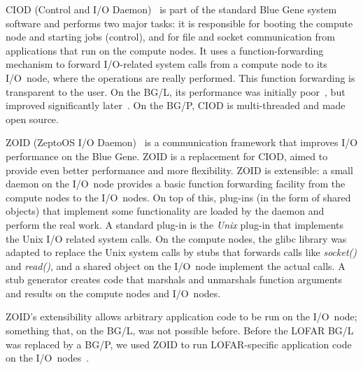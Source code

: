 \documentclass[conference]{worldcomp}
\begin{document}
CIOD (Control and I/O Daemon)~\cite{IBM:08} is part of the standard Blue Gene
system software and performs two major tasks: it is responsible for booting
the compute node and starting jobs (control), and for file and socket
communication from applications that run on the compute nodes.
It uses a function-forwarding mechanism to forward I/O-related system calls
from a compute node to its I/O~node, where the operations are really performed.
This function forwarding is transparent to the user.
On the BG/L, its performance was initially poor~\cite{Romein:06}, but
improved significantly later~\cite{Iskra:08}.
On the BG/P, CIOD is multi-threaded and made open source.

ZOID (ZeptoOS I/O Daemon)~\cite{Iskra:08} is a communication framework that
improves I/O performance on the Blue Gene.
ZOID is a replacement for CIOD, aimed to provide even better performance and
more flexibility.
ZOID is extensible: a small daemon on the I/O~node provides a basic function
forwarding facility from the compute nodes to the I/O~nodes.
On top of this, plug-ins (in the form of shared objects) that implement some
functionality are loaded by the daemon and perform the real work.
A standard plug-in is the \emph{Unix\/} plug-in that implements the
Unix I/O related system calls.
On the compute nodes, the glibc library was adapted to replace the Unix
system calls by stubs that forwards calls like \emph{socket()\/} and
\emph{read()}, and a shared object on the I/O~node implement the actual calls.
A stub generator creates code that marshals and unmarshals function
arguments and results on the compute nodes and I/O~nodes.

ZOID's extensibility allows arbitrary application code to be run on the
I/O~node; something that, on the BG/L, was not possible before.
Before the LOFAR BG/L was replaced by a BG/P, we used ZOID to run LOFAR-specific
application code on the I/O~nodes~\cite{Iskra:08}.

\end{document}
